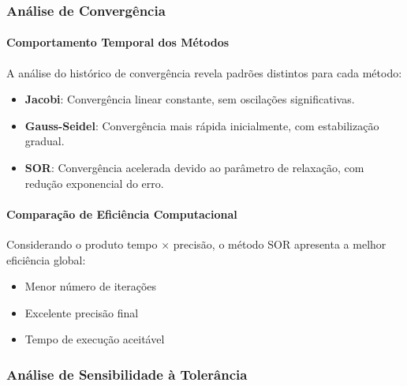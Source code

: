 \documentclass[12pt,a4paper]{article}
\begin{document}
\subsubsection{Análise de Convergência}
\paragraph{Comportamento Temporal dos Métodos}
A análise do histórico de convergência revela padrões distintos para cada método:
\begin{itemize}
    \item \textbf{Jacobi}: Convergência linear constante, sem oscilações significativas.
    \item \textbf{Gauss-Seidel}: Convergência mais rápida inicialmente, com estabilização gradual.
    \item \textbf{SOR}: Convergência acelerada devido ao parâmetro de relaxação, com redução exponencial do erro.
\end{itemize}

\paragraph{Comparação de Eficiência Computacional}
Considerando o produto tempo $\times$ precisão, o método SOR apresenta a melhor eficiência global:
\begin{itemize}
    \item Menor número de iterações
    \item Excelente precisão final
    \item Tempo de execução aceitável
\end{itemize}

\subsubsection{Análise de Sensibilidade à Tolerância}
\end{document}
